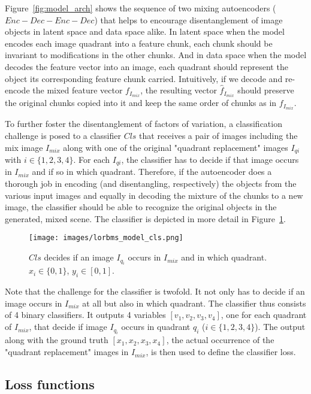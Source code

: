 \documentclass[12pt,a4paper]{article}
\begin{document}
Figure~\ref{fig:model_arch} shows the sequence of two mixing autoencoders ($Enc-Dec-Enc-Dec$) that helps to encourage disentanglement of image objects in latent space and data space alike. In latent space when the model encodes each image quadrant into a feature chunk, each chunk should be invariant to modifications in the other chunks. And in data space when the model decodes the feature vector into an image, each quadrant should represent the object its corresponding feature chunk carried. Intuitively, if we decode and re-encode the mixed feature vector $f_{I_{mix}}$, the resulting vector $\hat{f}_{I_{mix}}$ should preserve the original chunks copied into it and keep the same order of chunks as in $f_{I_{mix}}$.

To further foster the disentanglement of factors of variation, a classification challenge is posed to a classifier $Cls$ that receives a pair of images including the mix image $I_{mix}$ along with one of the original "quadrant replacement" images $I_{qi}$ with $i \in \{1,2,3,4\}$. For each $I_{qi}$, the classifier has to decide if that image occurs in $I_{mix}$ and if so in which quadrant. Therefore, if the autoencoder does a thorough job in encoding (and disentangling, respectively) the objects from the various input images and equally in decoding the mixture of the chunks to a new image, the classifier should be able to recognize the original objects in the generated, mixed scene. The classifier is depicted in more detail in Figure~\ref{fig:model_cls}.
\begin{figure}[ht]
\centering
\texttt{[image: images/lorbms\_model\_cls.png]}
\caption{$Cls$ decides if an image $I_{q_i}$ occurs in $I_{mix}$ and in which quadrant. $x_i \in \{0,1\}$, $y_i \in [0,1]$.}
\label{fig:model_cls}
\end{figure}
Note that the challenge for the classifier is twofold. It not only has to decide if an image occurs in $I_{mix}$ at all but also in which quadrant. The classifier thus consists of 4 binary classifiers. It outputs 4 variables $[v_1,v_2,v_3,v_4]$, one for each quadrant of $I_{mix}$, that decide if image $I_{q_i}$ occurs in quadrant $q_i$ ($i \in \{1,2,3,4\}$). The output along with the ground truth $[x_1,x_2,x_3,x_4]$, the actual occurrence of the "quadrant replacement" images in $I_{mix}$, is then used to define the classifier loss.

\subsection{Loss functions}
\end{document}
